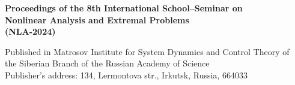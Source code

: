 \documentclass[12pt,final]{llncs}
\begin{document}
\begin{englisharticle}

\end{englisharticle}

\begin{englisharticle}

\end{englisharticle}

\begin{englisharticle}

\end{englisharticle}



\begin{englisharticle}

\end{englisharticle}

\begin{englisharticle}

\end{englisharticle}

\begin{englisharticle}

\end{englisharticle}

\begin{englisharticle}

\end{englisharticle}

\begin{englisharticle}

\end{englisharticle}

\begin{englisharticle}

\end{englisharticle}


\newpage

\newpage
\thispagestyle{empty}
 \begin{englisharticle}
\begin{center}
${}$
\vfill




{\bf  Proceedings of the 8th International School--Seminar on\\[0.3em]
 Nonlinear Analysis and Extremal Problems\\[0.3em]  (NLA-2024)}

\vfill\vfill



Published in Matrosov Institute for System Dynamics and Control Theory
of\\ the Siberian Branch of the Russian Academy of Science\\[0.5em]

Publisher's address: 134, Lermontova str., Irkutsk, Russia, 664033

\end{center}

 \end{englisharticle}
\end{document}
